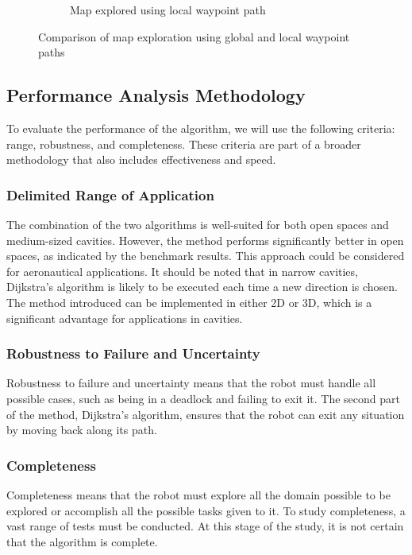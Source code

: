 \documentclass[../main.tex]{subfiles}
\begin{document}
\begin{figure}[H]
\begin{subfigure}[b]{0.45\textwidth}
		\caption{Map explored using local waypoint path}
		\label{fig:map_explored_using_lwp}
	\end{subfigure}
	\caption{Comparison of map exploration using global and local waypoint paths}
	\label{fig:map_exploration_comparison}
\end{figure}


\subsection{Performance Analysis Methodology}

To evaluate the performance of the algorithm, we will use the following criteria: range, robustness, and completeness. These criteria are part of a broader methodology that also includes effectiveness and speed.

\subsubsection{Delimited Range of Application}
The combination of the two algorithms is well-suited for both open spaces and medium-sized cavities. However, the method performs significantly better in open spaces, as indicated by the benchmark results. This approach could be considered for aeronautical applications. It should be noted that in narrow cavities, Dijkstra's algorithm is likely to be executed each time a new direction is chosen. The method introduced can be implemented in either 2D or 3D, which is a significant advantage for applications in cavities.

\subsubsection{Robustness to Failure and Uncertainty}
Robustness to failure and uncertainty means that the robot must handle all possible cases, such as being in a deadlock and failing to exit it. The second part of the method, Dijkstra's algorithm, ensures that the robot can exit any situation by moving back along its path.

\subsubsection{Completeness}
Completeness means that the robot must explore all the domain possible to be explored or accomplish all the possible tasks given to it. To study completeness, a vast range of tests must be conducted. At this stage of the study, it is not certain that the algorithm is complete.
\end{document}
